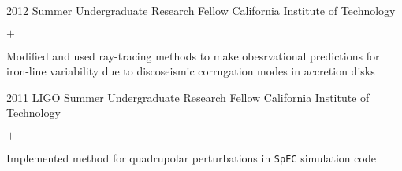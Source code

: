 \documentclass[]{luger-cv} %
\begin{document}
\begin{entrylist}
\ifdefined \onepage \else
\entry
{2012}
{Summer Undergraduate Research Fellow}
{California Institute of Technology}
{%
\vspace{-1em}
\begin{list}{$+$}{\cvlist}
\item Modified and used ray-tracing methods to make obesrvational predictions for iron-line variability due to discoseismic corrugation modes in accretion disks
\end{list}
}


\ifdefined \onepage \else
\entry
{2011}
{LIGO Summer Undergraduate Research Fellow}
{California Institute of Technology}
{%
\vspace{-1em}
\begin{list}{$+$}{\cvlist}
\item Implemented method for quadrupolar perturbations in \texttt{SpEC} simulation code
\end{list}
}
\fi


\end{entrylist}

\end{document}
